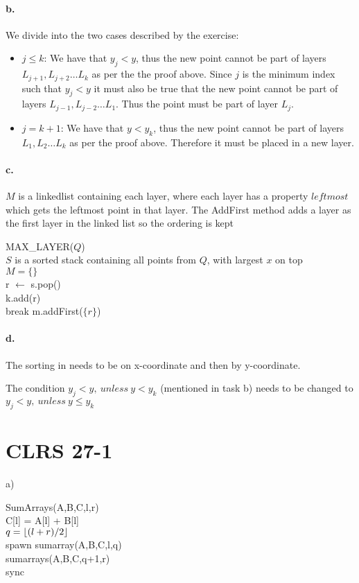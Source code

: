 \paragraph{b.}We divide into the two cases described by the exercise:
\begin{itemize}
\item $j \leq k$: We have that $y_j < y$, thus the new point cannot be part of layers $L_{j+1}, L_{j+2} \dots L_k$ as per the the proof above.
Since $j$ is the minimum index such that $y_j < y$ it must also be true that the new point cannot be part of layers $L_{j-1}, L_{j-2} \dots L_1$.
Thus the point must be part of layer $L_j$.
\item $j = k + 1$: We have that $y < y_k$, thus the new point cannot be part of layers $L_1, L_2 \dots L_k$ as per the proof above.
Therefore it must be placed in a new layer.
\end{itemize}

\paragraph{c.}
$M$ is a linkedlist containing each layer, where each layer has a property $leftmost$ which gets the leftmost point in that layer.
The AddFirst method adds a layer as the first layer in the linked list so the ordering is kept


\begin{algorithm}[H]
MAX\_LAYER($Q$) \\
$S$ is a sorted stack containing all points from $Q$, with largest $x$ on top \\
$M = \{ \}$ \\
{
	r $\leftarrow$ s.pop() \\
	{
		{
			k.add(r) \\
			break
		}
	}
	m.addFirst($\{r\}$)
}
\end{algorithm}

\paragraph{d.}

The sorting in needs to be on x-coordinate and then by y-coordinate.

The condition $ y_j < y, \ unless \ y < y_k $ (mentioned in task b) needs to be changed to $ y_j < y, \ unless \ y \leq y_k $

\section*{CLRS 27-1}

a)

\begin{algorithm}[H]
SumArrays(A,B,C,l,r)\\
{C[l] = A[l] + B[l]\\}
{$ q = \lfloor(l+r)/2\rfloor $\\
spawn sumarray(A,B,C,l,q)\\
sumarrays(A,B,C,q+1,r)\\
sync}
\end{algorithm}



